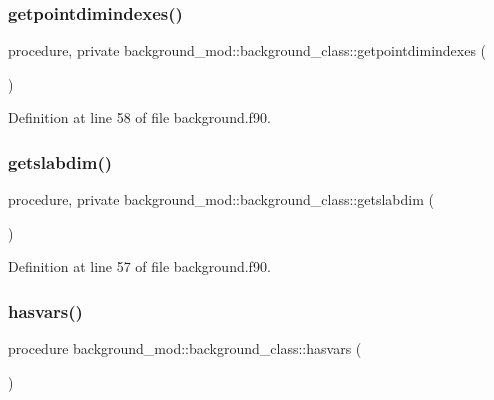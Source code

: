 \subsubsection{\texorpdfstring{getpointdimindexes()}{getpointdimindexes()}}
{\footnotesize\ttfamily procedure, private background\+\_\+mod\+::background\+\_\+class\+::getpointdimindexes (\begin{DoxyParamCaption}{ }\end{DoxyParamCaption})\hspace{0.3cm}{\ttfamily [private]}}



Definition at line 58 of file background.\+f90.

\mbox{\label{structbackground__mod_1_1background__class_ac7e39271ba1838a3f1548f10ff658de1}} 
\subsubsection{\texorpdfstring{getslabdim()}{getslabdim()}}
{\footnotesize\ttfamily procedure, private background\+\_\+mod\+::background\+\_\+class\+::getslabdim (\begin{DoxyParamCaption}{ }\end{DoxyParamCaption})\hspace{0.3cm}{\ttfamily [private]}}



Definition at line 57 of file background.\+f90.

\mbox{\label{structbackground__mod_1_1background__class_aa440524c5d056e02dafe44b0ee699cbd}} 
\subsubsection{\texorpdfstring{hasvars()}{hasvars()}}
{\footnotesize\ttfamily procedure background\+\_\+mod\+::background\+\_\+class\+::hasvars (\begin{DoxyParamCaption}{ }\end{DoxyParamCaption})\hspace{0.3cm}{\ttfamily [private]}}



